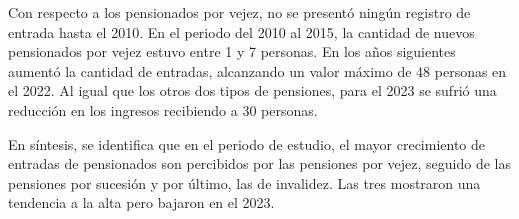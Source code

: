 \documentclass[
]{article}
\begin{document}
Con respecto a los pensionados por vejez, no se presentó ningún registro
de entrada hasta el 2010. En el periodo del 2010 al 2015, la cantidad de
nuevos pensionados por vejez estuvo entre 1 y 7 personas. En los años
siguientes aumentó la cantidad de entradas, alcanzando un valor máximo
de 48 personas en el 2022. Al igual que los otros dos tipos de
pensiones, para el 2023 se sufrió una reducción en los ingresos
recibiendo a 30 personas.

En síntesis, se identifica que en el periodo de estudio, el mayor
crecimiento de entradas de pensionados son percibidos por las pensiones
por vejez, seguido de las pensiones por sucesión y por último, las de
invalidez. Las tres mostraron una tendencia a la alta pero bajaron en el
2023.
\end{document}
